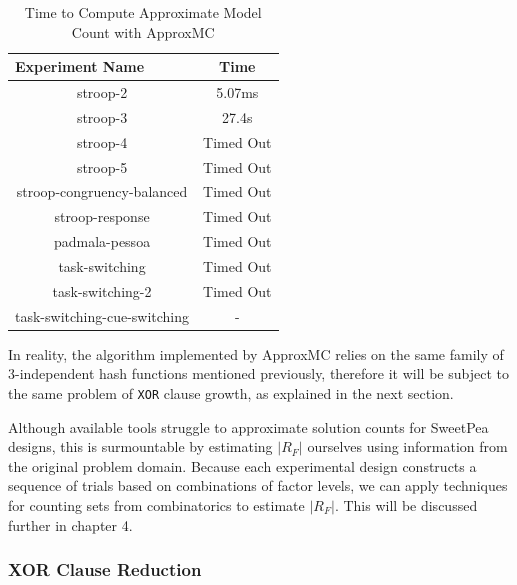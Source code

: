 \begin{table}[htb]
  \centering
  \caption{Time to Compute Approximate Model Count with ApproxMC}
\begin{tabular}{|c|c|}
\hline
\multicolumn{1}{|l|}{Experiment Name} & Time            \\ \hline
stroop-2                              & 5.07ms          \\ \hline
stroop-3                              & 27.4s           \\ \hline
stroop-4                              & Timed Out       \\ \hline
stroop-5                              & Timed Out       \\ \hline
stroop-congruency-balanced            & Timed Out       \\ \hline
stroop-response                       & Timed Out       \\ \hline
padmala-pessoa                        & Timed Out       \\ \hline
task-switching                        & Timed Out       \\ \hline
task-switching-2                      & Timed Out       \\ \hline
task-switching-cue-switching          & -               \\ \hline
\end{tabular}
\label{tab:benchmark_experiments_approxmc}%
\end{table}

In reality, the algorithm implemented by ApproxMC relies on the same family of 3-independent hash functions mentioned previously, therefore it will be subject to the same problem of \texttt{XOR} clause growth, as explained in the next section.

Although available tools struggle to approximate solution counts for SweetPea designs, this is surmountable by estimating $|R_F|$ ourselves using information from the original problem domain. Because each experimental design constructs a sequence of trials based on combinations of factor levels, we can apply techniques for counting sets from combinatorics to estimate $|R_F|$. This will be discussed further in chapter 4.

\subsubsection{XOR Clause Reduction}

